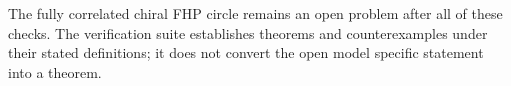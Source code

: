 \documentclass[11pt,a4paper]{article}
\begin{document}
The fully correlated chiral FHP circle remains an open problem after all of these checks. The verification suite establishes theorems and counterexamples under their stated definitions; it does not convert the open model specific statement into a theorem.



\end{document}
